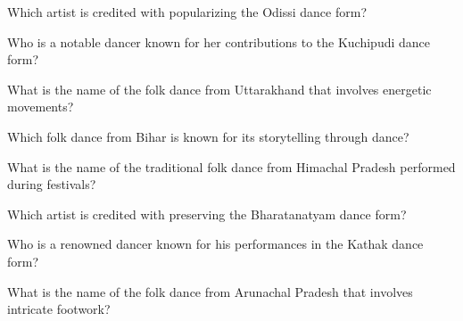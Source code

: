 \documentclass[12pt,a4paper]{book}
\begin{document}
\begin{enhancedmcq}[Question 30]{Which artist is credited with popularizing the Odissi dance form?}
\end{enhancedmcq}

\begin{enhancedmcq}[Question 31]{Who is a notable dancer known for her contributions to the Kuchipudi dance form?}
\end{enhancedmcq}

\begin{enhancedmcq}[Question 32]{What is the name of the folk dance from Uttarakhand that involves energetic movements?}
\end{enhancedmcq}

\begin{enhancedmcq}[Question 33]{Which folk dance from Bihar is known for its storytelling through dance?}
\end{enhancedmcq}

\begin{enhancedmcq}[Question 34]{What is the name of the traditional folk dance from Himachal Pradesh performed during festivals?}
\end{enhancedmcq}

\begin{enhancedmcq}[Question 35]{Which artist is credited with preserving the Bharatanatyam dance form?}
\end{enhancedmcq}

\begin{enhancedmcq}[Question 36]{Who is a renowned dancer known for his performances in the Kathak dance form?}
\end{enhancedmcq}

\begin{enhancedmcq}[Question 37]{What is the name of the folk dance from Arunachal Pradesh that involves intricate footwork?}
\end{enhancedmcq}
\end{document}
